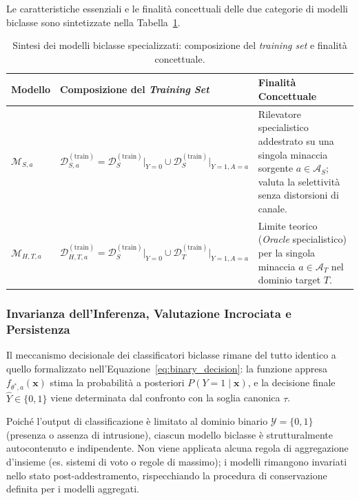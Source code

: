 Le caratteristiche essenziali e le finalità concettuali delle due categorie di modelli biclasse sono sintetizzate nella Tabella~\ref{tab:modelli_biclasse}.

\begin{table}[H]
    \centering
    \small
    \caption{Sintesi dei modelli biclasse specializzati: composizione del \textit{training set} e finalità concettuale.}
    \label{tab:modelli_biclasse}
    \begin{tabularx}{\textwidth}{l l >{\raggedright\arraybackslash}X }
        \toprule
        \textbf{Modello} & \textbf{Composizione del \textit{Training Set}} & \textbf{Finalità Concettuale} \\
        \midrule
        $\mathcal{M}_{S, a}$ &
        $\mathcal{D}_{S, a}^{(\text{train})} = \mathcal{D}_{S}^{(\text{train})}\big|_{Y=0} \cup \mathcal{D}_{S}^{(\text{train})}\big|_{Y=1, A=a}$ &
        Rilevatore specialistico addestrato su una singola minaccia sorgente $a \in \mathcal{A}_S$; valuta la selettività senza distorsioni di canale. \\
        \addlinespace
        $\mathcal{M}_{H, T, a}$ &
        $\mathcal{D}_{H, T, a}^{(\text{train})} = \mathcal{D}_{S}^{(\text{train})}\big|_{Y=0} \cup \mathcal{D}_{T}^{(\text{train})}\big|_{Y=1, A=a}$ &
        Limite teorico (\textit{Oracle} specialistico) per la singola minaccia $a \in \mathcal{A}_T$ nel dominio target $T$. \\
        \bottomrule
    \end{tabularx}
\end{table}

\subsubsection{Invarianza dell'Inferenza, Valutazione Incrociata e Persistenza}
\label{subsubsec:invarianza_biclasse}
Il meccanismo decisionale dei classificatori biclasse rimane del tutto identico a quello formalizzato nell'Equazione~\eqref{eq:binary_decision}: la funzione appresa $f_{\theta^*, a}(\mathbf{x})$ stima la probabilità a posteriori $P(Y = 1 \mid \mathbf{x})$, e la decisione finale $\hat{Y} \in \{0, 1\}$ viene determinata dal confronto con la soglia canonica $\tau$.

Poiché l'output di classificazione è limitato al dominio binario $\mathcal{Y} = \{0, 1\}$ (presenza o assenza di intrusione), ciascun modello biclasse è strutturalmente autocontenuto e indipendente. Non viene applicata alcuna regola di aggregazione d'insieme (es. sistemi di voto o regole di massimo); i modelli rimangono invariati nello stato post-addestramento, rispecchiando la procedura di conservazione definita per i modelli aggregati.

